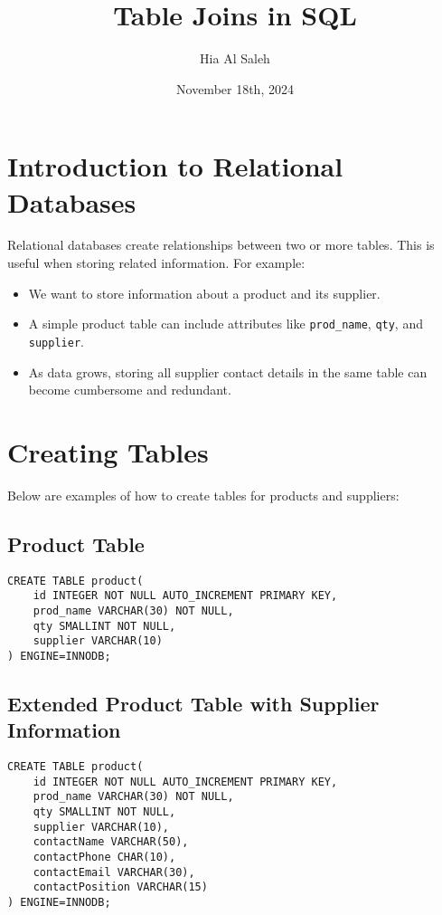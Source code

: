 \documentclass{article}
\begin{document}
\title{Table Joins in SQL}
\author{Hia Al Saleh}
\date{November 18th, 2024}
\maketitle
\tableofcontents
\newpage

\section{Introduction to Relational Databases}
Relational databases create relationships between two or more tables. This is useful when storing related information. For example:
\begin{itemize}
    \item We want to store information about a product and its supplier.
    \item A simple product table can include attributes like \texttt{prod\_name}, \texttt{qty}, and \texttt{supplier}.
    \item As data grows, storing all supplier contact details in the same table can become cumbersome and redundant.
\end{itemize}

\section{Creating Tables}
Below are examples of how to create tables for products and suppliers:
\subsection{Product Table}
\begin{verbatim}
CREATE TABLE product(
    id INTEGER NOT NULL AUTO_INCREMENT PRIMARY KEY,
    prod_name VARCHAR(30) NOT NULL,
    qty SMALLINT NOT NULL,
    supplier VARCHAR(10)
) ENGINE=INNODB;
\end{verbatim}

\subsection{Extended Product Table with Supplier Information}
\begin{verbatim}
CREATE TABLE product(
    id INTEGER NOT NULL AUTO_INCREMENT PRIMARY KEY,
    prod_name VARCHAR(30) NOT NULL,
    qty SMALLINT NOT NULL,
    supplier VARCHAR(10),
    contactName VARCHAR(50),
    contactPhone CHAR(10),
    contactEmail VARCHAR(30),
    contactPosition VARCHAR(15)
) ENGINE=INNODB;
\end{verbatim}
\end{document}
